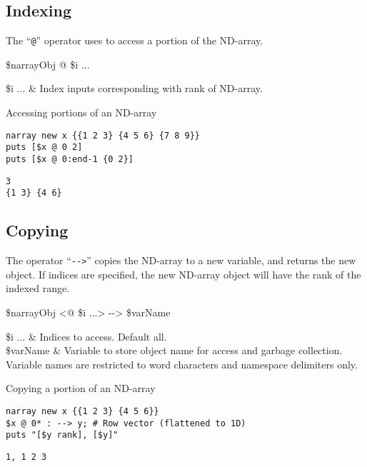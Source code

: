 \clearpage
\subsection{Indexing}
The ``\texttt{@}'' operator uses  to access a portion of the ND-array. 
\begin{syntax}
 \$narrayObj @ \$i ...
\end{syntax}
\begin{args}
\$i ... & Index inputs corresponding with rank of ND-array. \\
\end{args}

\begin{example}{Accessing portions of an ND-array}
\begin{lstlisting}
narray new x {{1 2 3} {4 5 6} {7 8 9}}
puts [$x @ 0 2]
puts [$x @ 0:end-1 {0 2}]
\end{lstlisting}
\tcblower
\begin{lstlisting}
3
{1 3} {4 6}
\end{lstlisting}
\end{example}

\subsection{Copying}
The operator ``\texttt{-{}->}'' copies the ND-array to a new variable, and returns the new object.
If indices are specified, the new ND-array object will have the rank of the indexed range.
\begin{syntax}
 \$narrayObj <@ \$i ...> -{}-> \$varName
\end{syntax}
\begin{args}
\$i ... & Indices to access. Default all. \\
\$varName & Variable to store object name for access and garbage collection. 
Variable names are restricted to word characters and namespace delimiters only.
\end{args}

\begin{example}{Copying a portion of an ND-array}
\begin{lstlisting}
narray new x {{1 2 3} {4 5 6}}
$x @ 0* : --> y; # Row vector (flattened to 1D)
puts "[$y rank], [$y]"
\end{lstlisting}
\tcblower
\begin{lstlisting}
1, 1 2 3
\end{lstlisting}
\end{example}
\clearpage

